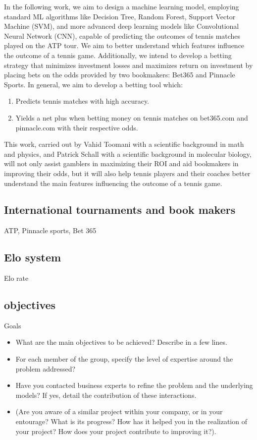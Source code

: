 \documentclass[preprint,aps,nofootinbib,a4paper,superscriptaddress,longbibliography,amsfonts,amssymb,amsmath,titlepage]{revtex4-2}
\begin{document}
In the following work, we aim to design a machine learning model, employing standard ML algorithms like Decision Tree, Random Forest, Support Vector Machine (SVM), and more advanced deep learning models like Convolutional Neural Network (CNN), capable of predicting the outcomes of tennis matches played on the ATP tour. We aim to better understand which features influence the outcome of a tennis game. Additionally, we intend to develop a betting strategy that minimizes investment losses and maximizes return on investment by placing bets on the odds provided by two bookmakers: Bet365 and Pinnacle Sports. In general, we aim to develop a betting tool which:
%
\begin{enumerate}
\item Predicts tennis matches with high accuracy.
\item Yields a net plus when betting money on tennis matches on bet365.com and pinnacle.com
with their respective odds.
\end{enumerate}
%
This work, carried out by Vahid Toomani with a scientific background in math and physics, and Patrick Schall with a scientific background in molecular biology, will not only assist gamblers in maximizing their ROI and aid bookmakers in improving their odds, but it will also help tennis players and their coaches better understand the main features influencing the outcome of a tennis game.

\subsection{International tournaments and book makers}
ATP, Pinnacle sports, Bet 365

\subsection{Elo system}
Elo rate

\subsection{objectives}
Goals
\begin{itemize}
\item What are the main objectives to be achieved? Describe in a few lines.
\item For each member of the group, specify the level of expertise around the problem addressed?
\item Have you contacted business experts to refine the problem and the underlying models? If yes, detail the contribution of these interactions.
\item (Are you aware of a similar project within your company, or in your entourage? What is its progress? How has it helped you in the realization of your project? How does your project contribute to improving it?).
\end{itemize}
\end{document}

